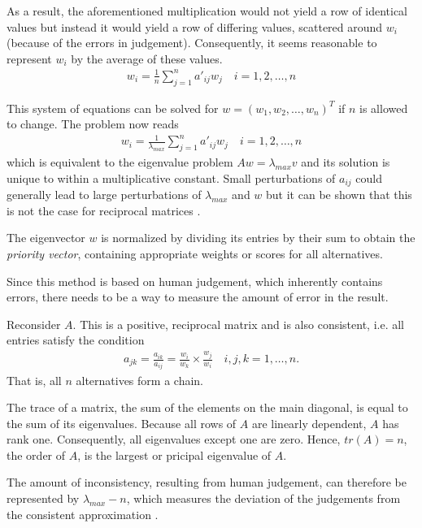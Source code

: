 As a result, the aforementioned multiplication would not yield a  row of identical values but instead it would yield a row of differing values, scattered around $w_i$ (because of the errors in judgement). Consequently, it seems reasonable to represent $w_i$ by the average of these values.
\begin{gather}
    w_i = \frac{1}{n} \sum_{j=1}^{n} a'_{ij}w_j \quad i = 1, 2, \ldots, n
\end{gather}

This system of equations can be solved for $w = (w_1, w_2, \ldots, w_n)^T$ if $n$ is allowed to change. The problem now reads
\begin{gather}
    w_i = \frac{1}{\lambda_{max}} \sum_{j=1}^{n} a'_{ij}w_j \quad i = 1, 2, \ldots, n
\end{gather}
which is equivalent to the eigenvalue problem $Aw = \lambda_{max} v$ and its solution is unique to within a multiplicative constant. Small perturbations of $a_{ij}$ could generally lead to large perturbations of $\lambda_{max}$ and $w$ but it can be shown that this is not the case for reciprocal matrices \cite[p.~192~--~197]{Saaty:1980}. 

The eigenvector $w$ is normalized by dividing its entries by their sum to obtain the \emph{priority vector}, containing appropriate weights or scores for all alternatives. 

Since this method is based on human judgement, which inherently contains errors, there needs to be a way to measure the amount of error in the result. 

Reconsider $A$. This is a positive, reciprocal matrix and is also consistent, i.e. all entries satisfy the condition
\begin{gather}
    a_{jk} = \frac{a_{ik}}{a_{ij}} = \frac{w_i}{w_k} \times \frac{w_j}{w_i} \quad i, j, k = 1, \ldots, n.
\end{gather}
That is, all $n$ alternatives form a chain.

The trace of a matrix, the sum of the elements on the main diagonal, is equal to the sum of its eigenvalues. Because all rows of $A$ are linearly dependent, $A$ has rank one. Consequently, all eigenvalues except one are zero. Hence, $tr(A) = n$, the order of $A$, is the largest or pricipal eigenvalue of $A$.

The amount of inconsistency, resulting from human judgement, can therefore be represented by $\lambda_{max} - n$, which measures the deviation of the judgements from the consistent approximation \cite{Saaty:1990}. 

